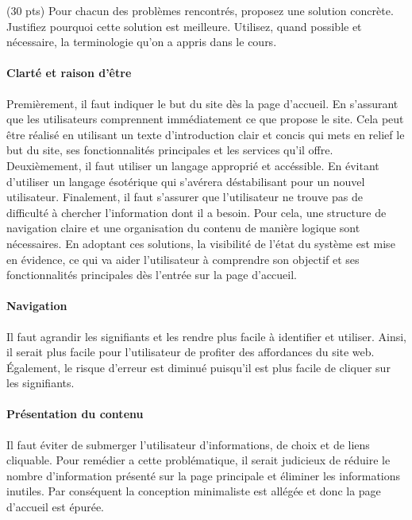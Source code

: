 \documentclass[9pt]{report}
\begin{document}
\begin{multicols*}{2}
  \begin{Exercice}{(30 pts)}{}
     Pour chacun des problèmes rencontrés, proposez une solution concrète. 
     Justifiez pourquoi cette solution est meilleure. Utilisez, 
     quand possible et nécessaire, la terminologie qu’on a appris dans 
     le cours.     
  \end{Exercice}

  \paragraph{Clarté et raison d'être}
Premièrement, il faut indiquer le but du site dès la page d’accueil. En s’assurant que les utilisateurs comprennent immédiatement ce que propose le site. Cela peut être réalisé en utilisant un texte d’introduction clair et concis qui mets en relief le but du site, ses fonctionnalités principales et les services qu’il offre.
Deuxièmement, il faut utiliser un langage approprié et accéssible. En évitant d’utiliser un langage ésotérique qui s’avérera déstabilisant pour un nouvel utilisateur.
Finalement, il faut s’assurer que l’utilisateur ne trouve pas de difficulté à chercher l’information dont il a besoin. Pour cela, une structure de navigation claire et une organisation du contenu de manière logique sont nécessaires.
En adoptant ces solutions, la visibilité de l’état du système est mise en évidence, ce qui va aider l’utilisateur à comprendre son objectif et ses fonctionnalités principales dès l’entrée sur la page d’accueil.

  \paragraph{Navigation}
Il faut agrandir les signifiants et les rendre plus facile à identifier et utiliser. Ainsi, il serait plus facile pour l’utilisateur de profiter des affordances du site web. Également, le risque d’erreur est diminué puisqu’il est plus facile de cliquer sur les signifiants.

  \paragraph{Présentation du contenu}
Il faut éviter de submerger l’utilisateur d'informations, de choix et de liens cliquable. Pour remédier a cette problématique, il serait judicieux de réduire le nombre d’information présenté sur la page principale et éliminer les informations inutiles.
Par conséquent la conception minimaliste est allégée et donc la page d’accueil est épurée.


\end{multicols*}
\end{document}
